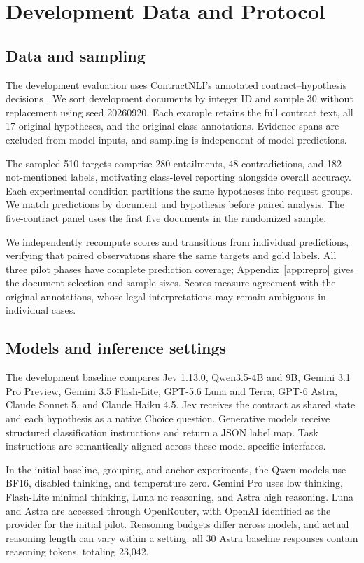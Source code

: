 \section{Development Data and Protocol}
\label{app:development-protocol}
\subsection{Data and sampling}
The development evaluation uses ContractNLI's annotated contract--hypothesis decisions \citep{koreeda2021contractnli}. We sort development documents by integer ID and sample 30 without replacement using seed 20260920. Each example retains the full contract text, all 17 original hypotheses, and the original class annotations. Evidence spans are excluded from model inputs, and sampling is independent of model predictions.

The sampled 510 targets comprise 280 entailments, 48 contradictions, and 182 not-mentioned labels, motivating class-level reporting alongside overall accuracy. Each experimental condition partitions the same hypotheses into request groups. We match predictions by document and hypothesis before paired analysis. The five-contract panel uses the first five documents in the randomized sample.

We independently recompute scores and transitions from individual predictions, verifying that paired observations share the same targets and gold labels. All three pilot phases have complete prediction coverage; Appendix~\ref{app:repro} gives the document selection and sample sizes. Scores measure agreement with the original annotations, whose legal interpretations may remain ambiguous in individual cases.

\subsection{Models and inference settings}
The development baseline compares Jev 1.13.0, Qwen3.5-4B and 9B, Gemini 3.1 Pro Preview, Gemini 3.5 Flash-Lite, GPT-5.6 Luna and Terra, GPT-6 Astra, Claude Sonnet 5, and Claude Haiku 4.5. Jev receives the contract as shared state and each hypothesis as a native Choice question. Generative models receive structured classification instructions and return a JSON label map. Task instructions are semantically aligned across these model-specific interfaces.

In the initial baseline, grouping, and anchor experiments, the Qwen models use BF16, disabled thinking, and temperature zero. Gemini Pro uses low thinking, Flash-Lite minimal thinking, Luna no reasoning, and Astra high reasoning. Luna and Astra are accessed through OpenRouter, with OpenAI identified as the provider for the initial pilot. Reasoning budgets differ across models, and actual reasoning length can vary within a setting: all 30 Astra baseline responses contain reasoning tokens, totaling 23,042.

